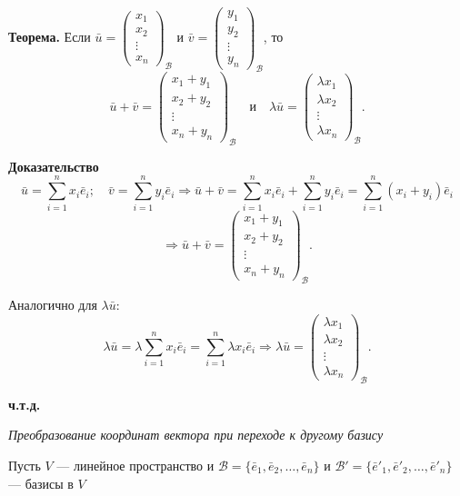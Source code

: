 \documentclass[12pt,a4paper]{article}
\newcommand{\vu}{\bar u}
\newcommand{\vv}{\bar v}
\newcommand{\ve}{\bar e}
\begin{document}
\textbf{Теорема.} Если $\vu =
\begin{pmatrix} x_1 \\ x_2 \\ \vdots \\ x_n
\end{pmatrix}_{\mathcal{B}}$ и $\vv =
\begin{pmatrix} y_1 \\ y_2 \\ \vdots \\ y_n
\end{pmatrix}_{\mathcal{B}}$, то
$$
\vu + \vv =
\begin{pmatrix} x_1 + y_1 \\ x_2 + y_2 \\ \vdots \\ x_n + y_n
\end{pmatrix}_{\mathcal{B}} \quad \text{и} \quad \lambda \vu =
\begin{pmatrix} \lambda x_1 \\ \lambda x_2 \\ \vdots \\ \lambda x_n
\end{pmatrix}_{\mathcal{B}}.
$$

\textbf{Доказательство}
$$
\vu = \sum_{i=1}^n x_i \ve_i; \quad \vv = \sum_{i=1}^n y_i \ve_i
\Rightarrow \vu + \vv = \sum_{i=1}^n x_i \ve_i + \sum_{i=1}^n y_i
\ve_i = \sum_{i=1}^n (x_i + y_i) \ve_i
$$
$$
\Rightarrow \vu + \vv =
\begin{pmatrix} x_1 + y_1 \\ x_2 + y_2 \\ \vdots \\ x_n + y_n
\end{pmatrix}_{\mathcal{B}}.
$$

Аналогично для $\lambda \vu$:
$$
\lambda \vu = \lambda \sum_{i=1}^n x_i \ve_i = \sum_{i=1}^n \lambda
x_i \ve_i \Rightarrow \lambda \vu =
\begin{pmatrix} \lambda x_1 \\ \lambda x_2 \\ \vdots \\ \lambda x_n
\end{pmatrix}_{\mathcal{B}}.
$$

\textbf{ч.т.д.}

\textit{Преобразование координат вектора при переходе к другому базису}

Пусть $V$ --- линейное пространство и $\mathcal{B} = \{\ve_1, \ve_2,
\ldots, \ve_n\}$ и $\mathcal{B}' = \{\ve'_1, \ve'_2, \ldots,
\ve'_n\}$ --- базисы в $V$
\end{document}
